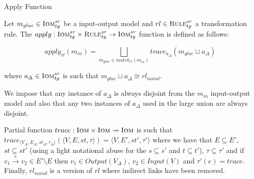\begin{definition}{Apply Function}
\label{def:apply_function}

  
Let $m_{glue}\in \textsc{Iom}^{sr}_{tg}$ be a input-output model and $rl\in \textsc{Rule}^{sr}_{tg}$ a
transformation rule. The $apply : \textsc{Iom}^{sr}_{tg}\times \textsc{Rule}^{sr}_{tg}\rightarrow \textsc{Iom}^{sr}_{tg}$ function
is defined as follows: 

$$apply_{rl}(m_{in})=\bigsqcup_{m_{glue}\in match_{rl}(m_{in})}trace_{a_{\Delta}}(m_{glue}\sqcup a_{\Delta})$$

\begin{center}
where $a_{\Delta}\in \textsc{Iom}^{sr}_{tg}$ is such that $m_{glue} \sqcup a_{\Delta}\cong rl_{noind}$.\\
\end{center}

We impose that any instance of $a_\Delta$ is always disjoint from the $m_{in}$ input-output model and also that any two instances of $a_\Delta$ used in the large union are always disjoint.

Partial function $trace:\textsc{Iom}\times \textsc{Iom} \nrightarrow \textsc{Iom}$ is such that $trace_{\langle V_{\Delta},E_{\Delta},st_{\Delta},\tau_{\Delta}\rangle}(\langle V,E,st,\tau\rangle) = \langle V,E',st',\tau'\rangle$ where we have that $E\subseteq E'$, $st\subseteq st'$ (using a light notational abuse for the $s\subseteq s'$ and $t\subseteq t'$), $\tau \subseteq \tau'$ and if $v_1\xrightarrow{e} v_2\in E'\setminus E$ then $v_1\in Output(V_{\Delta})$, $v_2\in Input(V)$ and $\tau'(e)=trace$. Finally, $rl_{noind}$ is a version of $rl$ where indirect links have been removed.
\end{definition}
% 

